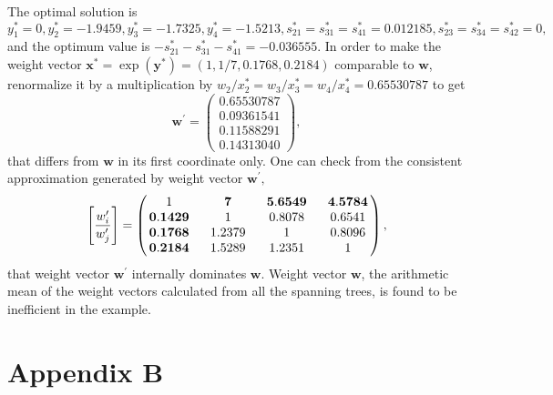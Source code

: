 \documentclass{article}
\theoremstyle{plain}
\begin{document}
The optimal solution is
$y^{\ast}_1 = 0,
y^{\ast}_2 = -1.9459,
y^{\ast}_3 = -1.7325,
y^{\ast}_4 = -1.5213,
s^{\ast}_{21} = s^{\ast}_{31} = s^{\ast}_{41} = 0.012185, s^{\ast}_{23} = s^{\ast}_{34} = s^{\ast}_{42} = 0,$
and the optimum value is $-s^{\ast}_{21}-s^{\ast}_{31}-s^{\ast}_{41} = -0.036555.$
In order to make the weight vector $\mathbf{x}^{\ast} = \exp({\mathbf{y}}^{\ast}) = (1, 1/7, 0.1768, 0.2184)$
comparable to ${\mathbf{w}}$, renormalize it by a multiplication by
${w}_2/x^{\ast}_2 = {w}_3/x^{\ast}_3 = {w}_4/x^{\ast}_4 = 0.65530787$ to get
 \[
{\mathbf{w}}^{\prime} =
\begin{pmatrix}
\mathbf{0.65530787}  \\
0.09361541 \\
0.11588291  \\
0.14313040
\end{pmatrix},
\]
that dif{\kern0pt}fers from ${\mathbf{w}}$ in its f{\kern0pt}irst coordinate only.
One can check from the consistent approximation generated by weight vector ${\mathbf{w}}^{\prime},$
\[
\left[ \frac{{w}^{\prime}_i}{{w}^{\prime}_j} \right] =
\begin{pmatrix}
$\,$    1   $\,\,$ & $\,\,$   \mathbf{7}    $\,\,$ & $\,\,$ \mathbf{5.6549} $\,\,$ & $\,\,$ \mathbf{4.5784} $\,$    \\
$\,$ \mathbf{0.1429} $\,\,$ & $\,\,$   1    $\,\,$ & $\,\,$ 0.8078 $\,\,$ & $\,\,$ 0.6541 $\,$    \\
$\,$ \mathbf{0.1768} $\,\,$ & $\,\,$ 1.2379 $\,\,$ & $\,\,$   1    $\,\,$ & $\,\,$ 0.8096 $\,$   \\
$\,$ \mathbf{0.2184} $\,\,$ & $\,\,$ 1.5289 $\,\,$ & $\,\,$ 1.2351 $\,\,$ & $\,\,$   1    $\,$
\end{pmatrix},
\]
that weight vector ${\mathbf{w}}^{\prime}$ internally dominates ${\mathbf{w}}$.
Weight vector ${\mathbf{w}}$, the arithmetic mean of the weight vectors calculated from all the spanning trees,
is found to be inef{\kern0pt}f{\kern0pt}icient in the example.


\section*{Appendix B} \label{section:AppendixB} %
\end{document}
